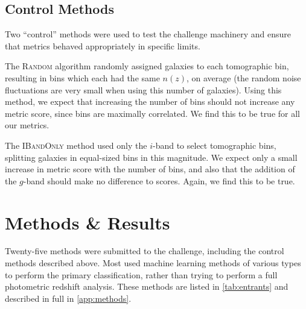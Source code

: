 \documentclass[twocolumn,twocolappendix]{aastex63}
\begin{document}
\subsection{Control Methods}

Two ``control'' methods were used to test the challenge machinery and ensure
that metrics behaved appropriately in specific limits.

The \textsc{Random} algorithm randomly assigned galaxies to each tomographic bin, resulting
in bins which each had the same $n(z)$, on average (the random noise fluctuations
are very small when using this number of galaxies).  Using this method, we expect
that increasing the number of bins should not increase any metric score, since bins are
maximally correlated.  We find this to be true for all our metrics.

The \textsc{IBandOnly} method used only the $i$-band to select tomographic bins,
splitting galaxies in equal-sized bins in this magnitude. We expect only a small
increase in metric score with the number of bins, and also that the addition of the $g$-band
should make no difference to scores.  Again, we find this to be true.



\section{Methods \& Results} \label{sec:results}


Twenty-five methods were submitted to the challenge, including the control methods described above.
Most used machine learning methods of various types to perform the primary classification,
rather than trying to perform a full photometric redshift analysis.  
These methods are listed in \autoref{tab:entrants} and described in full in \autoref{app:methods}.
\end{document}
